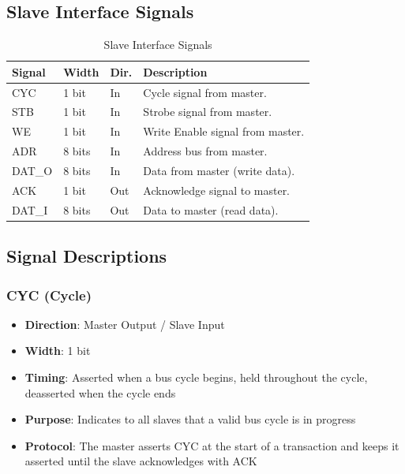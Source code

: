 \documentclass[12pt,a4paper]{article}
\begin{document}
\subsection{Slave Interface Signals}

\begin{table}[H]
    \centering
    \begin{tabular}{|p{2cm}|p{1.5cm}|p{1cm}|p{4cm}|}
        \hline
        \textbf{Signal} & \textbf{Width} & \textbf{Dir.} & \textbf{Description} \\
        \hline
        CYC & 1 bit & In & Cycle signal from master. \\
        STB & 1 bit & In & Strobe signal from master. \\
        WE & 1 bit & In & Write Enable signal from master. \\
        ADR & 8 bits & In & Address bus from master. \\
        DAT\_O & 8 bits & In & Data from master (write data). \\
        ACK & 1 bit & Out & Acknowledge signal to master. \\
        DAT\_I & 8 bits & Out & Data to master (read data). \\
        \hline
    \end{tabular}
    \caption{Slave Interface Signals}
\end{table}

\subsection{Signal Descriptions}

\subsubsection{CYC (Cycle)}
\begin{itemize}
    \item \textbf{Direction}: Master Output / Slave Input
    \item \textbf{Width}: 1 bit
    \item \textbf{Timing}: Asserted when a bus cycle begins, held throughout the cycle, deasserted when the cycle ends
    \item \textbf{Purpose}: Indicates to all slaves that a valid bus cycle is in progress
    \item \textbf{Protocol}: The master asserts CYC at the start of a transaction and keeps it asserted until the slave acknowledges with ACK
\end{itemize}
\end{document}

